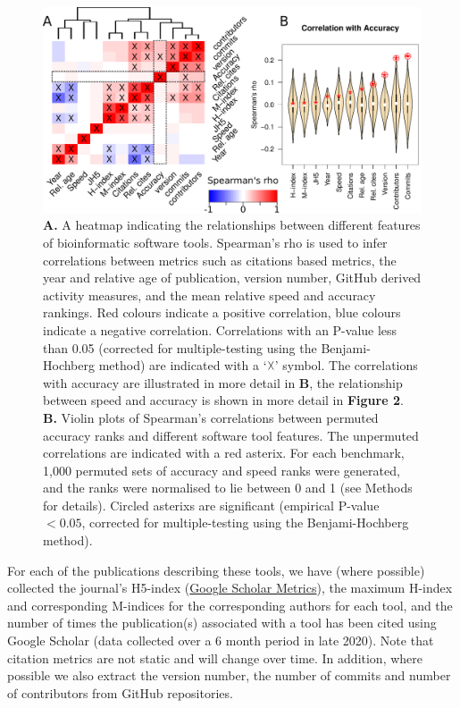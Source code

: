 \documentclass[fleqn,10pt]{SelfArx} %
\begin{document}
\begin{figure}[htb!]
\includegraphics[width=\textwidth]{figure1.pdf}
\caption{\textbf{A.} A heatmap indicating the relationships between
  different features of bioinformatic software tools. Spearman’s rho is used to
  infer correlations between metrics such as citations based metrics, the year and relative age of publication, 
  version number, GitHub derived activity measures, and 
  the mean
  relative speed and accuracy rankings. Red colours
  indicate a positive correlation, blue colours indicate a negative
  correlation. Correlations with an P-value less than 0.05 (corrected for multiple-testing using the Benjami-Hochberg method) are
  indicated with a `$\vartimes$' symbol. The correlations with accuracy are illustrated in
  more detail in \textbf{B}, the relationship between speed and
  accuracy is shown in more detail in \textbf{Figure 2}.
  \textbf{B.} Violin plots of Spearman's correlations between permuted accuracy ranks and 
    different software tool features. 
    The unpermuted correlations are indicated with a red asterix.
    For each benchmark, 1,000 permuted sets of accuracy and speed ranks were generated, and the ranks were normalised to lie between 0 and 1 (see Methods for details).
  Circled asterixs are significant (empirical P-value $< 0.05$, corrected for multiple-testing using the Benjami-Hochberg method).}
\label{fig:allfactors}
\end{figure}

For each of the publications describing these tools, we have (where
possible) collected the journal's H5-index (\href{https://scholar.google.co.nz/citations?view\_op=top\_venues\&hl=en}{Google
Scholar Metrics}), the maximum H-index and
corresponding M-indices \cite{Hirsch2005-mt} for the corresponding
authors for each tool, and the number of times the publication(s)
associated with a tool has been cited using Google Scholar (data
collected over a 6 month period in late 2020). Note that citation metrics
are not static and will change over time. In addition, where possible we also extract the version number, the number
of commits and number of contributors from GitHub repositories.  
\end{document}
